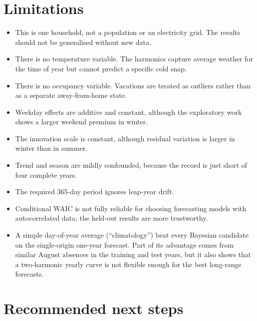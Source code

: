 \documentclass[11pt]{article}
\begin{document}
\section{Limitations}

\begin{itemize}[leftmargin=*]
\item This is one household, not a population or an electricity grid. The
  results should not be generalised without new data.
\item There is no temperature variable. The harmonics capture average weather
  for the time of year but cannot predict a specific cold snap.
\item There is no occupancy variable. Vacations are treated as outliers rather
  than as a separate away-from-home state.
\item Weekday effects are additive and constant, although the exploratory work
  shows a larger weekend premium in winter.
\item The innovation scale is constant, although residual variation is larger
  in winter than in summer.
\item Trend and season are mildly confounded, because the record is just short
  of four complete years.
\item The required 365-day period ignores leap-year drift.
\item Conditional WAIC is not fully reliable for choosing forecasting models
  with autocorrelated data; the held-out results are more trustworthy.
\item A simple day-of-year average (``climatology'') beat every Bayesian
  candidate on the single-origin one-year forecast. Part of its advantage comes
  from similar August absences in the training and test years, but it also
  shows that a two-harmonic yearly curve is not flexible enough for the best
  long-range forecasts.
\end{itemize}

\section{Recommended next steps}
\end{document}
